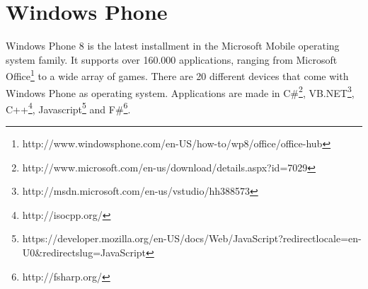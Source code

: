 \section{Windows Phone}
Windows Phone 8 is the latest installment in the Microsoft Mobile operating system family. It supports over 160.000 applications, ranging from Microsoft Office\footnote{http://www.windowsphone.com/en-US/how-to/wp8/office/office-hub} to a wide array of games. There are 20 different devices that come with Windows Phone as operating system. 
Applications are made in C\#\footnote{http://www.microsoft.com/en-us/download/details.aspx?id=7029}, VB.NET\footnote{http://msdn.microsoft.com/en-us/vstudio/hh388573}, C++\footnote{http://isocpp.org/}, Javascript\footnote{https://developer.mozilla.org/en-US/docs/Web/JavaScript?redirectlocale=en-U0\&redirectslug=JavaScript} and F\#\footnote{http://fsharp.org/}.
